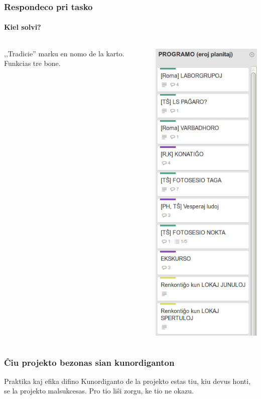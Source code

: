   \begin{frame}
    \frametitle{Respondeco pri tasko}
    \framesubtitle{Kiel solvi?}

    \begin{columns}
    	
    ,,Tradicie'' marku en nomo de la karto. Funkcias tre bone.
    	
    
    \includegraphics[scale=0.2]{ekranoj/respondeco-pri-karto}
	
	\end{columns}
  \end{frame}


  \begin{frame}
    \frametitle{Ĉiu projekto bezonas sian kunordiganton}

	\begin{block}{Praktika kaj efika difino}
		Kunordiganto de la projekto estas tiu, kiu devus honti, se la projekto malsukcesas. Pro tio liŝi zorgu, ke tio ne okazu.
	\end{block}
	    
  \end{frame}
